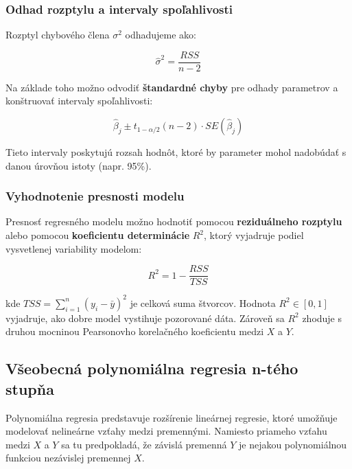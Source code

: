 \subsubsection{Odhad rozptylu a intervaly spoľahlivosti}

Rozptyl chybového člena $\sigma^2$ odhadujeme ako:

\begin{equation}
\hat{\sigma}^2 = \frac{RSS}{n - 2}
\end{equation}

Na základe toho možno odvodiť \textbf{štandardné chyby} pre odhady parametrov a konštruovať intervaly spoľahlivosti:

\begin{equation}
\hat{\beta}_j \pm t_{1 - \alpha/2}(n - 2) \cdot SE(\hat{\beta}_j)
\end{equation}

Tieto intervaly poskytujú rozsah hodnôt, ktoré by parameter mohol nadobúdať s danou úrovňou istoty (napr. 95\%).

\subsubsection{Vyhodnotenie presnosti modelu}

Presnosť regresného modelu možno hodnotiť pomocou \textbf{reziduálneho rozptylu} alebo pomocou \textbf{koeficientu determinácie} $R^2$, ktorý vyjadruje podiel vysvetlenej variability modelom:

\begin{equation}
R^2 = 1 - \frac{RSS}{TSS}
\end{equation}

kde $TSS = \sum_{i=1}^{n}(y_i - \bar{y})^2$ je celková suma štvorcov. Hodnota $R^2 \in [0, 1]$ vyjadruje, ako dobre model vystihuje pozorované dáta. Zároveň sa $R^2$ zhoduje s druhou mocninou Pearsonovho korelačného koeficientu medzi $X$ a $Y$.

\subsection{Všeobecná polynomiálna regresia n-tého stupňa}
\label{subsec:polynomial_regression}

Polynomiálna regresia predstavuje rozšírenie lineárnej regresie, ktoré umožňuje modelovať nelineárne vzťahy medzi premennými. Namiesto priameho vzťahu medzi $X$ a $Y$ sa tu predpokladá, že závislá premenná $Y$ je nejakou polynomiálnou funkciou nezávislej premennej $X$.

